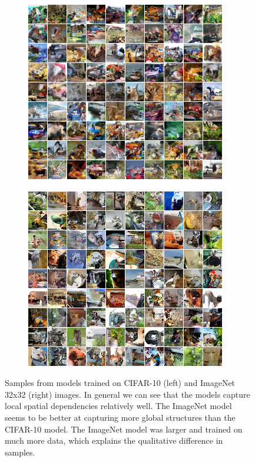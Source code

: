 \begin{figure}[ht]
\begin{subfigure}{.5\textwidth}
  \centering
  \includegraphics[trim={0 0 0 0},clip, width=0.95\linewidth]{cifar_samples_bilstm_nl5_nh256_cropped.png}
\end{subfigure}%
\hfill
\begin{subfigure}{.5\textwidth}
  \centering
  \includegraphics[trim={0 0 0 0},clip, width=0.95\linewidth]{imnet32_samples_residual_nh384_cropped.png}
\end{subfigure}%
\hfill
\caption{Samples from models trained on CIFAR-10 (left) and ImageNet 32x32 (right) images. In general we can see that the models capture local spatial dependencies relatively well. The ImageNet model seems to be better at capturing more global structures than the CIFAR-10 model. The ImageNet model was larger and trained on much more data, which explains the qualitative difference in samples.}
\label{fig:samples_32}
\end{figure}

